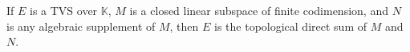If $E$ is a TVS over $\mathbb{K}$, $M$ is a closed linear subspace of finite codimension, and $N$ is any algebraic supplement of $M$, then $E$ is the topological direct sum of $M$ and $N$.